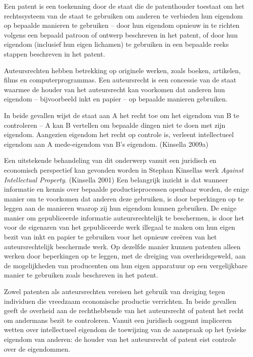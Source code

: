 \documentclass[
  a5paper,
  smalldemyvopaper,11pt,twoside,onecolumn,openright,extrafontsizes,
hidelinks]{memoir}
\begin{document}
Een patent is een toekenning door de staat die de patenthouder toestaat
om het rechtssysteem van de staat te gebruiken om anderen te verbieden
hun eigendom op bepaalde manieren te gebruiken -- door hun eigendom
opnieuw in te richten volgens een bepaald patroon of ontwerp beschreven
in het patent, of door hun eigendom (inclusief hun eigen lichamen) te
gebruiken in een bepaalde reeks stappen beschreven in het patent.

Auteursrechten hebben betrekking op originele werken, zoals boeken,
artikelen, films en computerprogrammas. Een auteursrecht is een
concessie van de staat waarmee de houder van het auteursrecht kan
voorkomen dat anderen hun eigendom -- bijvoorbeeld inkt en papier -- op
bepaalde manieren gebruiken.

In beide gevallen wijst de staat aan A het recht toe om het eigendom van
B te controleren -- A kan B vertellen om bepaalde dingen niet te doen
met zijn eigendom. Aangezien eigendom het recht op controle is, verleent
intellectueel eigendom aan A mede-eigendom van B's eigendom. (Kinsella
2009a)

Een uitstekende behandeling van dit onderwerp vanuit een juridisch en
economisch perspectief kan gevonden worden in Stephan Kinsellas werk
\emph{Against Intellectual Property}. (Kinsella 2001) Een belangrijk
inzicht is dat wanneer informatie en kennis over bepaalde
productieprocessen openbaar worden, de enige manier om te voorkomen dat
anderen deze gebruiken, is door beperkingen op te leggen aan de manieren
waarop zij hun eigendom kunnen gebruiken. De enige manier om
gepubliceerde informatie auteursrechtelijk te beschermen, is door het
voor de eigenaren van het gepubliceerde werk illegaal te maken om hun
eigen bezit van inkt en papier te gebruiken voor het opnieuw creëren van
het auteursrechtelijk beschermde werk. Op dezelfde manier kunnen
patenten alleen werken door beperkingen op te leggen, met de dreiging
van overheidsgeweld, aan de mogelijkheden van producenten om hun eigen
apparatuur op een vergelijkbare manier te gebruiken zoals beschreven in
het patent.

Zowel patenten als auteursrechten vereisen het gebruik van dreiging
tegen individuen die vreedzaam economische productie verrichten. In
beide gevallen geeft de overheid aan de rechthebbende van het
auteursrecht of patent het recht om andermans bezit te controleren.
Vanuit een juridisch oogpunt impliceren wetten over intellectueel
eigendom de toewijzing van de aanspraak op het fysieke eigendom van
anderen: de houder van het auteursrecht of patent eist controle over de
eigendommen.
\end{document}
